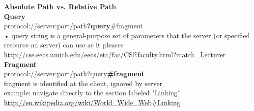\documentclass{article}
\begin{document}
\textbf{Absolute Path vs. Relative Path}\\
\textbf{Query}\\
protocol://server:port/path\textbf{?query}#fragment\\
• query string is a general-purpose set of parameters that the server
(or specified resource on server) can use as it pleases\\
\url{http://cse.eecs.umich.edu/eecs/etc/fac/CSEfaculty.html?match=Lecturer}\\
\textbf{Fragment}\\
protocol://server:port/path?query\textbf{#fragment}\\
fragment is identified at the client, ignored by server\\
example: navigate directly to the section labeled "Linking" \url{http://en.wikipedia.org/wiki/World_Wide_Web#Linking}\\
\end{document}
